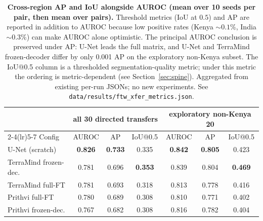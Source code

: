 \documentclass{article}
\newcommand{\tablebodygap}{\vspace{0.45em}}
\begin{document}
\begin{table}[H]\centering\small
\caption{\textbf{Cross-region AP and IoU alongside AUROC (mean over 10 seeds per pair,
then mean over pairs).} Threshold metrics (IoU at $0.5$) and AP are reported in addition
to AUROC because low positive rates (Kenya $\sim0.1\%$, India $\sim0.3\%$) can make
AUROC alone optimistic. The principal AUROC conclusion is preserved under AP: U-Net
leads the full matrix, and U-Net and TerraMind frozen-decoder differ by only 0.001 AP on the
exploratory non-Kenya subset. The IoU@0.5 column is a
thresholded segmentation-quality metric; under this metric the ordering is
metric-dependent (see Section~\ref{sec:spine}). Aggregated from existing per-run JSONs;
no new experiments. See \texttt{data/results/ftw\_xfer\_metrics.json}.}
\label{tab:xfer_metrics}
\tablebodygap
\setlength{\tabcolsep}{4pt}
\begin{tabular}{@{}lcccccc@{}}
\toprule
& \multicolumn{3}{c}{all 30 directed transfers} & \multicolumn{3}{c}{exploratory non-Kenya 20} \\
\cmidrule(lr){2-4}\cmidrule(lr){5-7}
Config & AUROC & AP & IoU@0.5 & AUROC & AP & IoU@0.5 \\
\midrule
U-Net (scratch)   & \textbf{0.826} & \textbf{0.733} & 0.335 & \textbf{0.842} & \textbf{0.805} & 0.423 \\
TerraMind frozen-dec. & 0.781 & 0.696 & \textbf{0.353} & 0.839 & 0.804 & \textbf{0.469} \\
TerraMind full-FT & 0.781 & 0.693 & 0.318 & 0.813 & 0.778 & 0.416 \\
Prithvi full-FT   & 0.780 & 0.689 & 0.308 & 0.810 & 0.771 & 0.402 \\
Prithvi frozen-dec. & 0.767 & 0.682 & 0.308 & 0.816 & 0.782 & 0.404 \\
\bottomrule
\end{tabular}
\end{table}
\end{document}
